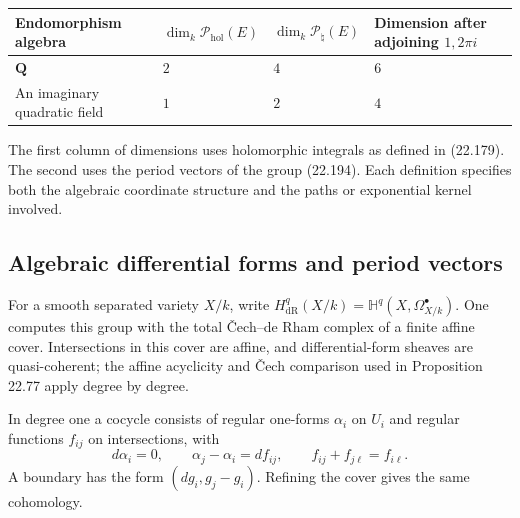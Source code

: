 \documentclass[
  11pt,
  a4paper,
]{article}
\newcounter{none} %
\begin{document}
{\def\LTcaptype{none} %
\begin{longtable}[]{@{}
  >{\raggedright\arraybackslash}p{}
  >{\raggedleft\arraybackslash}p{}
  >{\raggedleft\arraybackslash}p{}
  >{\raggedleft\arraybackslash}p{}@{}}
\toprule\noalign{}
\begin{minipage}[b]{\linewidth}\raggedright
Endomorphism algebra
\end{minipage} & \begin{minipage}[b]{\linewidth}\raggedleft
\(\dim_k\mathcal P_{\mathrm{hol}}(E)\)
\end{minipage} & \begin{minipage}[b]{\linewidth}\raggedleft
\(\dim_k\mathcal P_\natural(E)\)
\end{minipage} & \begin{minipage}[b]{\linewidth}\raggedleft
Dimension after adjoining \(1,2\pi i\)
\end{minipage} \\
\midrule\noalign{}
\endhead
\bottomrule\noalign{}
\endlastfoot
\(\mathbf Q\) & \(2\) & \(4\) & \(6\) \\
An imaginary quadratic field & \(1\) & \(2\) & \(4\) \\
\end{longtable}
}

The first column of dimensions uses holomorphic integrals as defined in
(22.179). The second uses the period vectors of the group (22.194). Each
definition specifies both the algebraic coordinate structure and the
paths or exponential kernel involved.

\subsection{Algebraic differential forms and period
vectors}\label{algebraic-differential-forms-and-period-vectors}

For a smooth separated variety \(X/k\), write
\(H^q_{\mathrm{dR}}(X/k)=\mathbb H^q(X,\Omega^\bullet_{X/k})\). One
computes this group with the total Čech--de Rham complex of a finite
affine cover. Intersections in this cover are affine, and
differential-form sheaves are quasi-coherent; the affine acyclicity and
Čech comparison used in Proposition 22.77 apply degree by degree.

In degree one a cocycle consists of regular one-forms \(\alpha_i\) on
\(U_i\) and regular functions \(f_{ij}\) on intersections, with \[
 d\alpha_i=0,\qquad
 \alpha_j-\alpha_i=df_{ij},\qquad
 f_{ij}+f_{j\ell}=f_{i\ell}.
 \tag{22.203}
\] A boundary has the form \((dg_i,g_j-g_i)\). Refining the cover gives
the same cohomology.
\end{document}
